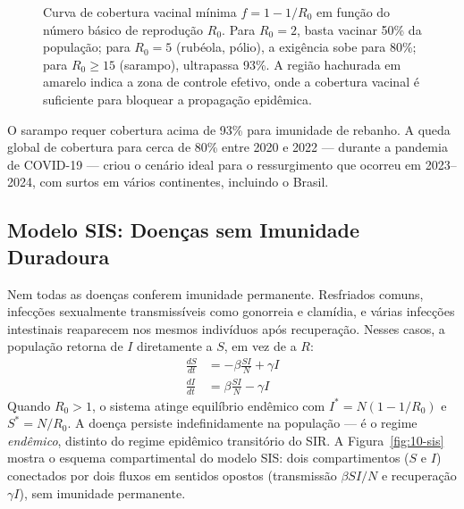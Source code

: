\begin{figure}[htbp]
\centering
{}
\caption{Curva de cobertura vacinal mínima $f = 1 - 1/R_0$ em função do número básico de reprodução $R_0$. Para $R_0 = 2$, basta vacinar 50\% da população; para $R_0 = 5$ (rubéola, pólio), a exigência sobe para 80\%; para $R_0 \geq 15$ (sarampo), ultrapassa 93\%. A região hachurada em amarelo indica a zona de controle efetivo, onde a cobertura vacinal é suficiente para bloquear a propagação epidêmica.}
\label{fig:10-vaccination}
\end{figure}

\begin{exemploenumv}
O sarampo requer cobertura acima de 93\% para imunidade de rebanho. A
queda global de cobertura para cerca de 80\% entre 2020 e 2022 --- durante a
pandemia de COVID-19 --- criou o cenário ideal para o ressurgimento que
ocorreu em 2023--2024, com surtos em vários continentes, incluindo o Brasil.
\end{exemploenumv}

\subsection{Modelo SIS: Doenças sem Imunidade Duradoura}
\label{sub:image10-sis}

Nem todas as doenças conferem imunidade permanente. Resfriados comuns,
infecções sexualmente transmissíveis como gonorreia e clamídia, e várias
infecções intestinais reaparecem nos mesmos indivíduos após recuperação.
Nesses casos, a população retorna de $I$ diretamente a $S$, em vez de a $R$:
\begin{align}
\frac{dS}{dt} &= -\beta \frac{SI}{N} + \gamma I \\
\frac{dI}{dt} &= \beta \frac{SI}{N} - \gamma I
\end{align}
Quando $R_0 > 1$, o sistema atinge equilíbrio endêmico com $I^* = N(1 - 1/R_0)$
e $S^* = N/R_0$. A doença persiste indefinidamente na população --- é o regime
\emph{endêmico}, distinto do regime epidêmico transitório do SIR. A
Figura~\ref{fig:10-sis} mostra o esquema compartimental do modelo SIS: dois
compartimentos ($S$ e $I$) conectados por dois fluxos em sentidos opostos
(transmissão $\beta SI/N$ e recuperação $\gamma I$), sem imunidade
permanente.

